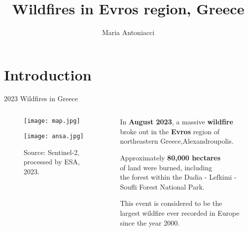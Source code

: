 \documentclass{beamer}
\title{Wildfires in Evros region, Greece}
\author{Maria Antoniacci}
\institute{Scienze e Gestione della Natura - Unibo}
\begin{document}
\maketitle


\section{Introduction} %

\begin{frame}{2023 Wildfires in Greece}

\begin{columns}

    \begin{column}{0.65\textwidth}
    \begin{figure}
    \centering
    \texttt{[image: map.jpg]}
    \end{figure}
    
     \begin{figure}
     \centering
     \texttt{[image: ansa.jpg]}
    
    {\tiny{Source: Sentinel-2, processed by ESA, 2023.}}
   \end{figure}  
    
    \end{column}

    \begin{column}{0.5\textwidth}
        \scriptsize In \textbf{August 2023}, a massive \textbf{wildfire}\\ broke out in the \textbf{Evros} region of northeastern Greece,\reaching Alexandroupolis.
        
        \bigskip
        Approximately \textbf{80,000 hectares}\\ of land were burned, including\\ the forest within the Dadia - Lefkimi - Soufli Forest National Park.
        
        \bigskip
        This event is considered to be the\\ largest wildfire ever recorded in Europe since the year 2000. 
       
    \end{column}
    
\end{columns}
\end{frame}
\end{document}
